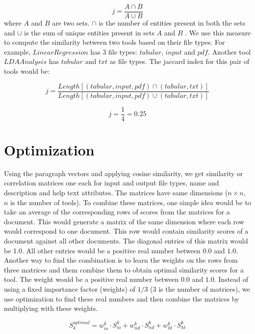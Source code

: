 \begin{equation}
j = \frac{A \cap B}{A \cup B}
\end{equation}
where $A$ and $B$ are two sets. $\cap$ is the number of entities present in both the sets and $\cup$ is the sum of unique entities present in sets $A$ and $B$ \cite{Ivchenko1998}. We use this measure to compute the similarity between two tools based on their file types. For example, $LinearRegression$ has 3 file types: $tabular$, $input$ and $pdf$. Another tool $LDAAnalysis$ has $tabular$ and $txt$ as file types. The jaccard index for this pair of tools would be:

\begin{equation}
j = \frac{Length[(tabular, input, pdf) \cap (tabular, txt)]}{Length[(tabular, input, pdf) \cup (tabular, txt)]}
\end{equation}

\begin{equation}
j = \frac{1}{4} = 0.25
\end{equation}


\section{Optimization}
Using the paragraph vectors and applying cosine similarity, we get similarity or correlation matrices one each for input and output file types, name and description and help text attributes. The matrices have same dimensions ($n \times n$, $n$ is the number of tools). To combine these matrices, one simple idea would be to take an average of the corresponding rows of scores from the matrices for a document. This would generate a matrix of the same dimension where each row would correspond to one document. This row would contain similarity scores of a document against all other documents. The diagonal entries of this matrix would be 1.0. All other entries would be a positive real number between $0.0$ and $1.0$. Another way to find the combination is to learn the weights on the rows from three matrices and them combine them to obtain optimal similarity scores for a tool. The weight would be a positive real number between $0.0$ and $1.0$. Instead of using a fixed importance factor (weights) of $1 / 3$ ($3$ is the number of matrices), we use optimization to find these real numbers and then combine the matrices by multiplying with these weights.

\begin{equation}
S_k^{optimal} = w^k_{io} \cdot S^k_{io} +  w^k_{nd} \cdot S^k_{nd} + w^k_{ht} \cdot S^k_{ht}
\end{equation}

